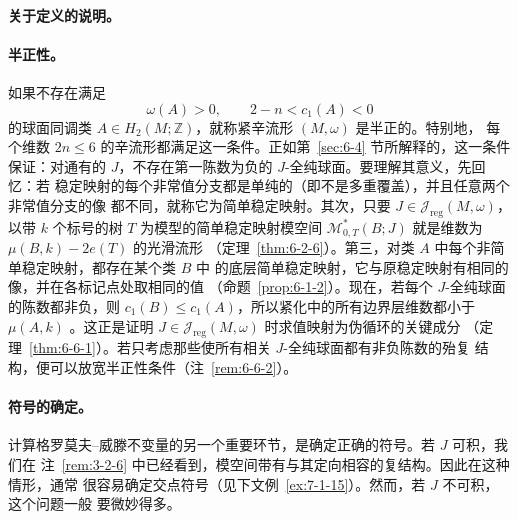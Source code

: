 \paragraph{关于定义的说明。}

\paragraph{半正性。}
如果不存在满足
\[
  \omega(A)>0,
  \qquad
  2-n<c_1(A)<0
\]
的球面同调类 $A\in H_2(M;\mathbb Z)$，就称紧辛流形 $(M,\omega)$ 是半正的。特别地，
每个维数 $2n\le6$ 的辛流形都满足这一条件。正如第~\ref{sec:6-4} 节所解释的，这一条件
保证：对通有的 $J$，不存在第一陈数为负的 $J$-全纯球面。要理解其意义，先回忆：若
稳定映射的每个非常值分支都是单纯的（即不是多重覆盖），并且任意两个非常值分支的像
都不同，就称它为简单稳定映射。其次，只要 $J\in\mathcal J_{\mathrm{reg}}(M,\omega)$，
以带 $k$ 个标号的树 $T$ 为模型的简单稳定映射模空间
$\mathcal M^*_{0,T}(B;J)$ 就是维数为 $\mu(B,k)-2e(T)$ 的光滑流形
（定理~\ref{thm:6-2-6}）。第三，对类 $A$ 中每个非简单稳定映射，都存在某个类 $B$ 中
的底层简单稳定映射，它与原稳定映射有相同的像，并在各标记点处取相同的值
（命题~\ref{prop:6-1-2}）。现在，若每个 $J$-全纯球面的陈数都非负，则
$c_1(B)\le c_1(A)$，所以紧化中的所有边界层维数都小于 $\mu(A,k)$
。这正是证明
$J\in\mathcal J_{\mathrm{reg}}(M,\omega)$ 时求值映射为伪循环的关键成分
（定理~\ref{thm:6-6-1}）。若只考虑那些使所有相关 $J$-全纯球面都有非负陈数的殆复
结构，便可以放宽半正性条件（注~\ref{rem:6-6-2}）。

\paragraph{符号的确定。}
计算格罗莫夫--威滕不变量的另一个重要环节，是确定正确的符号。若 $J$ 可积，我们在
注~\ref{rem:3-2-6} 中已经看到，模空间带有与其定向相容的复结构。因此在这种情形，通常
很容易确定交点符号（见下文例~\ref{ex:7-1-15}）。然而，若 $J$ 不可积，这个问题一般
要微妙得多。

